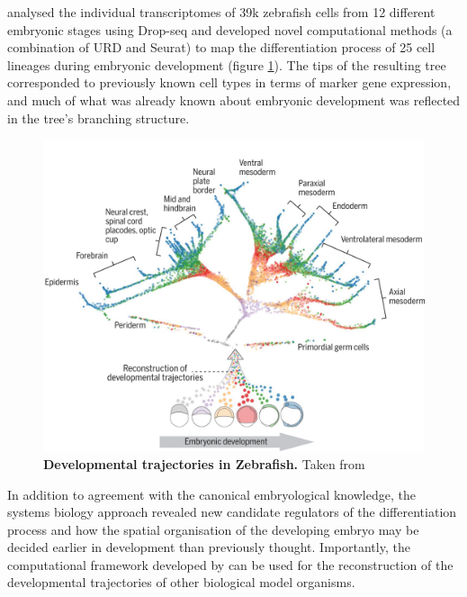 \citeauthor{farrell2018} analysed the individual transcriptomes of 39k zebrafish cells from 12 different embryonic stages using Drop-seq and developed novel computational methods (a combination of URD and Seurat) to map the differentiation process of 25 cell lineages during embryonic development (figure \ref{fig:farrell2018}). The tips of the resulting tree corresponded to previously known cell types in terms of marker gene expression, and much of what was already known about embryonic development was reflected in the tree's branching structure.\pms

\begin{figure}[ht]
	\begin{minipage}[]{0.70\textwidth}
		\includegraphics[width=\textwidth]{./ims/farrell2018.png}
	\end{minipage}\hfill
	\begin{minipage}[]{0.25\textwidth}
		\caption[Developmental trajectories in Zebrafish embryogenesis]{\textbf{Developmental trajectories in Zebrafish.} Taken from \cite{farrell2018}}
		\label{fig:farrell2018}
	\end{minipage}
\end{figure}

In addition to agreement with the canonical embryological knowledge, the systems biology approach revealed new candidate regulators of the differentiation process and how the spatial organisation of the developing embryo may be decided earlier in development than previously thought. Importantly, the computational framework developed by \citeauthor{farrell2018} can be used for the reconstruction of the developmental trajectories of other biological model organisms.\pms

